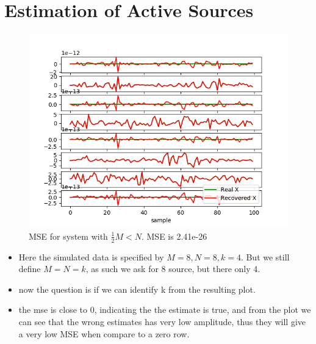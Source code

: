 \chapter{Estimation of Active Sources}
\begin{figure}[H]
    \centering
	\includegraphics[scale=0.5]{figures/ch_7/M=N_testk=4.png}
	\caption{MSE for system with $\frac{1}{2} M<N$. MSE is 2.41e-26}
	\label{fig:M=N_k=4}
\end{figure}  
\begin{itemize}
\item Here the simulated data is specified by $M=8,N=8,k=4$. But we still define $M=N=k$, as such we ask for 8 source, but there only 4. 
\item now the question is if we can identify k from the resulting plot.  
\item the mse is close to 0, indicating the the estimate is true, and from the plot we can see that the wrong estimates has very low amplitude, thus they will give a very low MSE when compare to a zero row.
\end{itemize}

